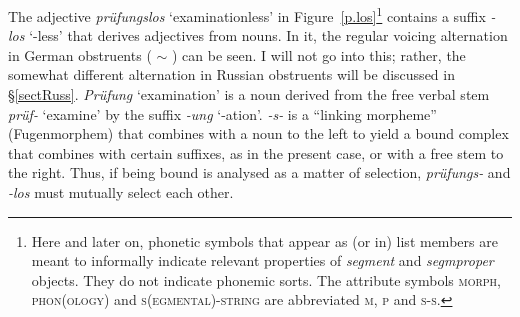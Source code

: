 \documentclass[output=paper]{langsci/langscibook}
\begin{document}
The adjective \emph{pr\"ufungslos} `examinationless'
in Figure~\ref{p.los}\footnote{Here and later on, phonetic symbols that
  appear as (or in) list members are meant to informally indicate relevant
  properties of \textit{segment}\/ and \textit{segmproper}\/ objects. They do not
  indicate phonemic sorts.  The attribute symbols \textsc{morph},
  \textsc{phon(ology)} and \textsc{s(egmental)-string} are abbreviated
  \textsc{m}, \textsc{p} and \textsc{s-s}.%
}
contains a suffix \emph{-los}
`-less' that derives adjectives from nouns. In it, the regular voicing
alternation in German obstruents (\textipa{[z} $\sim$
\textipa{s]}) can be seen.  I will not go into this; rather, the somewhat
different alternation in Russian obstruents will be discussed
in \S\ref{sectRuss}.  \emph{Pr\"ufung} `examination' is a noun derived from
the free verbal stem \emph{pr\"uf-} `examine' by the suffix \emph{-ung}
`\mbox{-ation}'.  \emph{-s-} is a ``linking morpheme'' (Fugenmorphem) that
com\-bines with a noun to the left to yield a bound complex that combines
with certain suffixes, as in the present case, or with a free stem to the
right. Thus, if being bound is analysed as a matter of selection,
\emph{pr\"ufungs-} and \emph{-los} must mutually select each other.
\end{document}
